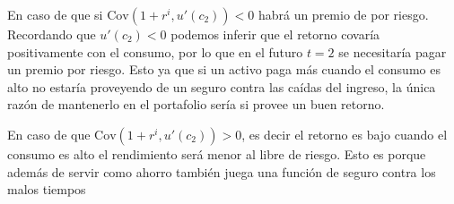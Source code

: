 En caso de que si $\text{Cov}(1+r^i,u'(c_2))<0$ habrá un premio de por riesgo. Recordando que $u'(c_2)<0$ podemos inferir que el retorno covaría positivamente con el consumo, por lo que en el futuro $t=2$ se necesitaría pagar un premio por riesgo. Esto ya que si un activo paga más cuando el consumo es alto no estaría proveyendo de un seguro contra las caídas del ingreso, la única razón de mantenerlo en el portafolio sería si provee un buen retorno. 

En caso de que $\text{Cov}(1+r^i,u'(c_2))>0$, es decir el retorno es bajo cuando el consumo es alto el rendimiento será menor al libre de riesgo. Esto es porque además de servir como ahorro también juega una función de seguro contra los malos tiempos


